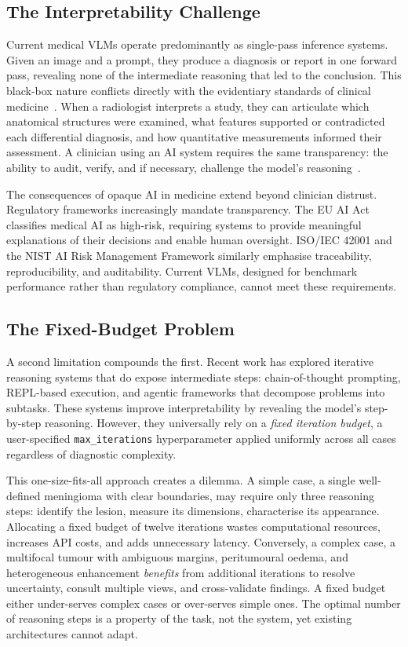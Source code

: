 \documentclass{article}
\begin{document}
	\subsection{The Interpretability Challenge}
	
	Current medical VLMs operate predominantly as single-pass inference systems. Given an image and a prompt, they produce a diagnosis or report in one forward pass, revealing none of the intermediate reasoning that led to the conclusion. This black-box nature conflicts directly with the evidentiary standards of clinical medicine~\citep{ghassemi2021clinical}. When a radiologist interprets a study, they can articulate which anatomical structures were examined, what features supported or contradicted each differential diagnosis, and how quantitative measurements informed their assessment. A clinician using an AI system requires the same transparency: the ability to audit, verify, and if necessary, challenge the model's reasoning~\citep{raji2020closing, amini2024foundation}.
	
	The consequences of opaque AI in medicine extend beyond clinician distrust. Regulatory frameworks increasingly mandate transparency. The EU AI Act classifies medical AI as high-risk, requiring systems to provide meaningful explanations of their decisions and enable human oversight. ISO/IEC 42001 and the NIST AI Risk Management Framework similarly emphasise traceability, reproducibility, and auditability. Current VLMs, designed for benchmark performance rather than regulatory compliance, cannot meet these requirements.
	
	\subsection{The Fixed-Budget Problem}
	
	A second limitation compounds the first. Recent work has explored iterative reasoning systems that do expose intermediate steps: chain-of-thought prompting, REPL-based execution, and agentic frameworks that decompose problems into subtasks. These systems improve interpretability by revealing the model's step-by-step reasoning. However, they universally rely on a \emph{fixed iteration budget}, a user-specified \texttt{max\_iterations} hyperparameter applied uniformly across all cases regardless of diagnostic complexity.
	
	This one-size-fits-all approach creates a dilemma. A simple case, a single well-defined meningioma with clear boundaries, may require only three reasoning steps: identify the lesion, measure its dimensions, characterise its appearance. Allocating a fixed budget of twelve iterations wastes computational resources, increases API costs, and adds unnecessary latency. Conversely, a complex case, a multifocal tumour with ambiguous margins, peritumoural oedema, and heterogeneous enhancement \emph{benefits} from additional iterations to resolve uncertainty, consult multiple views, and cross-validate findings. A fixed budget either under-serves complex cases or over-serves simple ones. The optimal number of reasoning steps is a property of the task, not the system, yet existing architectures cannot adapt.
	
\end{document}
